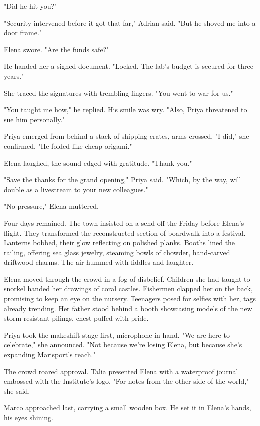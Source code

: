 "Did he hit you?"

"Security intervened before it got that far," Adrian said. "But he shoved me into a door frame."

Elena swore. "Are the funds safe?"

He handed her a signed document. "Locked. The lab's budget is secured for three years."

She traced the signatures with trembling fingers. "You went to war for us."

"You taught me how," he replied. His smile was wry. "Also, Priya threatened to sue him personally."

Priya emerged from behind a stack of shipping crates, arms crossed. "I did," she confirmed. "He folded like cheap origami."

Elena laughed, the sound edged with gratitude. "Thank you."

"Save the thanks for the grand opening," Priya said. "Which, by the way, will double as a livestream to your new colleagues."

"No pressure," Elena muttered.

\bigskip

Four days remained. The town insisted on a send-off the Friday before Elena's flight. They transformed the reconstructed section of boardwalk into a festival. Lanterns bobbed, their glow reflecting on polished planks. Booths lined the railing, offering sea glass jewelry, steaming bowls of chowder, hand-carved driftwood charms. The air hummed with fiddles and laughter.

Elena moved through the crowd in a fog of disbelief. Children she had taught to snorkel handed her drawings of coral castles. Fishermen clapped her on the back, promising to keep an eye on the nursery. Teenagers posed for selfies with her, tags already trending. Her father stood behind a booth showcasing models of the new storm-resistant pilings, chest puffed with pride.

Priya took the makeshift stage first, microphone in hand. "We are here to celebrate," she announced. "Not because we're losing Elena, but because she's expanding Marisport's reach."

The crowd roared approval. Talia presented Elena with a waterproof journal embossed with the Institute's logo. "For notes from the other side of the world," she said.

Marco approached last, carrying a small wooden box. He set it in Elena's hands, his eyes shining.

